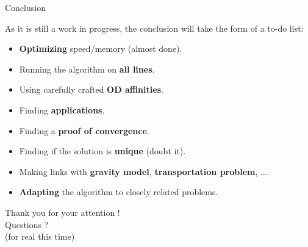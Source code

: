 \documentclass[10pt]{beamer}
\newcommand{\imp}[1]{\textbf{\color{cyan}#1}}
\begin{document}
	\begin{frame}{Conclusion}
		
		As it is still a work in progress, the conclusion will take the form of a to-do list:
		\begin{itemize}
			\item \imp{Optimizing} speed/memory (almost done).
			\item Running the algorithm on \imp{all lines}.
			\item Using carefully crafted \imp{OD affinities}. 
			\item Finding \imp{applications}.
			\item Finding a \imp{proof of convergence}. 
			\item Finding if the solution is \imp{unique} (doubt it).
			\item Making links with \imp{gravity model}, \imp{transportation problem}, ...
			\item \imp{Adapting} the algorithm to closely related problems.
		\end{itemize}
		
	\end{frame}

	
	
	\begin{frame}
		
		\begin{center}
			\huge Thank you for your attention ! \\
			Questions ? \\
			\vspace{1cm}
			\small
			(for real this time)
		\end{center}
		
		
	\end{frame}
	
	
\end{document}
